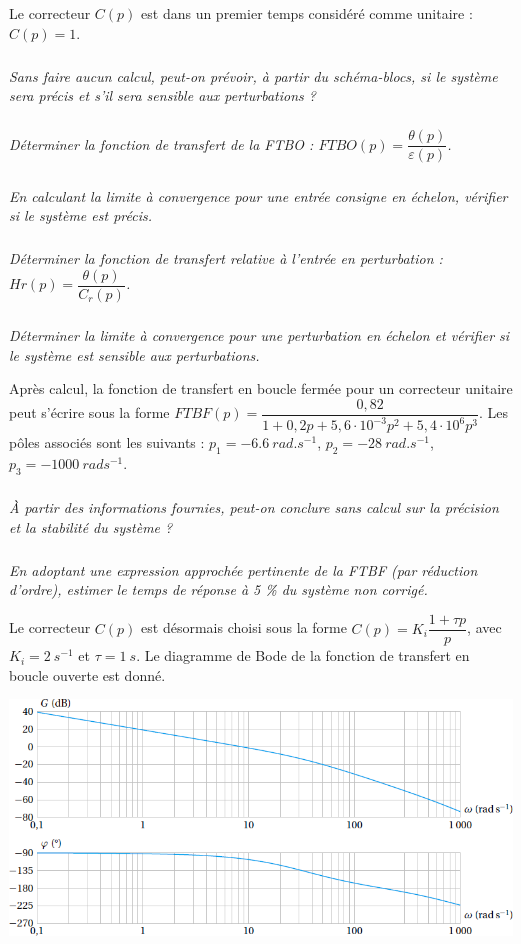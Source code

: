 \documentclass[10pt,fleqn]{article} %
\begin{document}
\begin{multicols}{2}
Le correcteur $C(p)$ est dans un premier temps considéré comme unitaire : $C(p) = 1$.

\subparagraph{}\textit{Sans faire aucun calcul, peut-on prévoir, à partir du schéma-blocs, si le
système sera précis et s’il sera sensible aux perturbations ?}

\subparagraph{}\textit{Déterminer la fonction de transfert de la FTBO : $FTBO(p) = \dfrac{\theta(p)}{\varepsilon(p)}$.}

\subparagraph{}\textit{En calculant la limite à convergence pour une entrée consigne en échelon, vérifier si le système est précis.}

\subparagraph{}\textit{Déterminer la fonction de transfert relative à l’entrée en perturbation : $Hr (p) = \dfrac{\theta(p)}{C_r(p)}$.}

\subparagraph{}\textit{Déterminer la limite à convergence pour une perturbation en échelon et vérifier si le système est sensible aux perturbations.}

Après calcul, la fonction de transfert en boucle fermée pour un correcteur unitaire peut s’écrire
sous la forme 
$FTBF(p) = \dfrac{0,82}{1+0,2p+5,6\cdot 10^{-3}p^2+5,4\cdot10^6 p^3}$. 
Les pôles associés sont les suivants : 
$p_1 = \SI{-6,6}{rad.s^{-1}}$, $p_2 = \SI{-28}{rad.s^{-1}}$, 
$p_3 = \SI{-1000}{rad s^{-1}}$.

\subparagraph{}\textit{À partir des informations fournies, peut-on conclure sans calcul sur la précision et la stabilité du système ?}

\subparagraph{}\textit{En adoptant une expression approchée pertinente de la FTBF (par réduction d’ordre), estimer le temps de réponse à 5 \% du système non corrigé.}
\vspace{.25cm}

Le correcteur $C(p)$ est désormais choisi sous la forme $C(p) = K_i\dfrac{1+\tau p}{p}$, 
avec $K_i = \SI{2}{s^{-1}}$ et $\tau =\SI{1}{s}$. Le
diagramme de Bode de la fonction de transfert en boucle ouverte est donné.


\begin{center}
\includegraphics[width=\linewidth]{images/fig_03}
\end{center}


\end{multicols}
\end{document}
